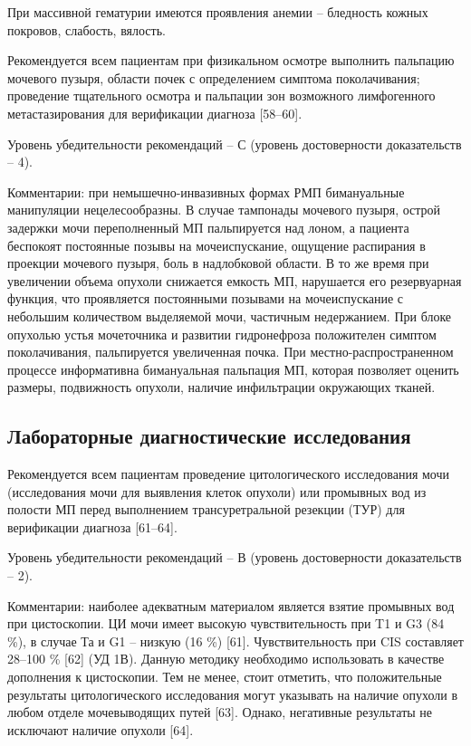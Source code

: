 При массивной гематурии имеются проявления анемии – бледность кожных покровов, слабость, вялость.

Рекомендуется всем пациентам при физикальном осмотре выполнить пальпацию мочевого пузыря, области почек с определением симптома поколачивания; проведение тщательного осмотра и пальпации зон возможного лимфогенного метастазирования для верификации диагноза [58–60].

Уровень убедительности рекомендаций – С (уровень достоверности доказательств – 4).

Комментарии: при немышечно-инвазивных формах РМП бимануальные манипуляции нецелесообразны. В случае тампонады мочевого пузыря, острой задержки мочи переполненный МП пальпируется над лоном, а пациента беспокоят постоянные позывы на мочеиспускание, ощущение распирания в проекции мочевого пузыря, боль в надлобковой области. В то же время при увеличении объема опухоли снижается емкость МП, нарушается его резервуарная функция, что проявляется постоянными позывами на мочеиспускание с небольшим количеством выделяемой мочи, частичным недержанием. При блоке опухолью устья мочеточника и развитии гидронефроза положителен симптом поколачивания, пальпируется увеличенная почка. При местно-распространенном процессе информативна бимануальная пальпация МП, которая позволяет оценить размеры, подвижность опухоли, наличие инфильтрации окружающих тканей.

\subsection{Лабораторные диагностические исследования}
\label{sec:}

Рекомендуется всем пациентам проведение цитологического исследования мочи (исследования мочи для выявления клеток опухоли) или промывных вод из полости МП перед выполнением трансуретральной резекции (ТУР) для верификации диагноза [61–64].

Уровень убедительности рекомендаций – В (уровень достоверности доказательств – 2).

Комментарии: наиболее адекватным материалом является взятие промывных вод при цистоскопии. ЦИ мочи имеет высокую чувствительность при T1 и G3 (84 \%), в случае Та и G1 – низкую (16 \%) [61]. Чувствительность при CIS составляет 28–100 \% [62] (УД 1В). Данную методику необходимо использовать в качестве дополнения к цистоскопии. Тем не менее, стоит отметить, что положительные результаты цитологического исследования могут указывать на наличие опухоли в любом отделе мочевыводящих путей [63]. Однако, негативные результаты не исключают наличие опухоли [64].

